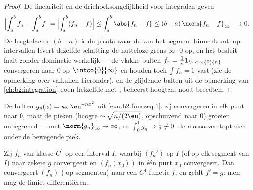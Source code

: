 \begin{proof}
De lineariteit en de driehoeksongelijkheid voor integralen geven
\[
\Bigl|\int_a^b f_n - \int_a^b f\Bigr|
= \Bigl|\int_a^b (f_n - f)\Bigr|
\leq \int_a^b\abs{f_n - f}
\leq (b - a)\,\norm{f_n - f}_\infty \longrightarrow 0 .
\]
De lengtefactor $(b - a)$ is de plaats waar de  van het
segment binnenkomt: op  intervallen levert dezelfde
schatting de nutteloze grens $\infty\cdot0$ op, en het besluit
faalt zonder dominatie werkelijk --- de vlakke bulten $f_n =
\frac1n\mathbf 1_{\intcc{0}{n}}$ convergeren  naar $0$ op
$\intco{0}{\infty}$ en houden toch $\int f_n = 1$ vast (zie de
opmerking over valkuilen hieronder), en de glijdende bulten uit de
opmerking van \cref{ch:b2:integration} doen hetzelfde met
;  beheerst hoogten,
nooit breedten.
\end{proof}

\begin{omfigure}

{\small De bulten $g_n(x) = nx\,\eu^{-nx^2}$ uit
\cref{exo:b2:funcseq:1}: zij convergeren in elk punt naar $0$, maar
de pieken (hoogte $\sim\sqrt{n/(2\eu)}$, opschuivend naar $0$)
groeien onbegrensd ---  met
$\norm{g_n}_\infty \to \infty$, en $\int_0^1 g_n \to \frac12 \neq
0$: de massa verstopt zich onder de bewegende piek.}
\end{omfigure}

\begin{theorem}[Differentiatie]\label{thm:b2:funcseq:differentiation}
Zij $f_n$ van klasse $C^1$ op een interval $I$, waarbij $(f_n')$
\emph{} op $I$ (of op elk segment van $I$) naar zekere $g$
convergeert en $(f_n(x_0))$ in één punt $x_0$ convergeert. Dan
convergeert $(f_n)$ ( op segmenten) naar een
$C^1$-functie $f$, en geldt $f' = g$: men mag de limiet
differentiëren.
\end{theorem}

